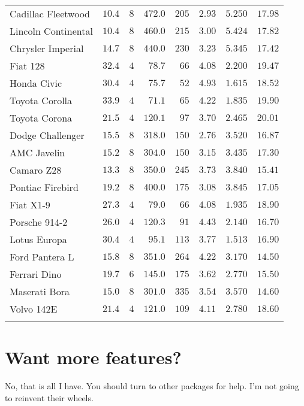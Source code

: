 \documentclass{article}\usepackage[]{graphicx}\usepackage[]{color}
\begin{document}
\begin{longtable}{lrrrrrrr}
Cadillac Fleetwood & \(10.4\) & \(8\) & \(472.0\) & \(205\) & \(2.93\) & \(5.250\) & \(17.98\)\\
\addlinespace
Lincoln Continental & \(10.4\) & \(8\) & \(460.0\) & \(215\) & \(3.00\) & \(5.424\) & \(17.82\)\\
Chrysler Imperial & \(14.7\) & \(8\) & \(440.0\) & \(230\) & \(3.23\) & \(5.345\) & \(17.42\)\\
Fiat 128 & \(32.4\) & \(4\) & \(78.7\) & \(66\) & \(4.08\) & \(2.200\) & \(19.47\)\\
Honda Civic & \(30.4\) & \(4\) & \(75.7\) & \(52\) & \(4.93\) & \(1.615\) & \(18.52\)\\
Toyota Corolla & \(33.9\) & \(4\) & \(71.1\) & \(65\) & \(4.22\) & \(1.835\) & \(19.90\)\\
\addlinespace
Toyota Corona & \(21.5\) & \(4\) & \(120.1\) & \(97\) & \(3.70\) & \(2.465\) & \(20.01\)\\
Dodge Challenger & \(15.5\) & \(8\) & \(318.0\) & \(150\) & \(2.76\) & \(3.520\) & \(16.87\)\\
AMC Javelin & \(15.2\) & \(8\) & \(304.0\) & \(150\) & \(3.15\) & \(3.435\) & \(17.30\)\\
Camaro Z28 & \(13.3\) & \(8\) & \(350.0\) & \(245\) & \(3.73\) & \(3.840\) & \(15.41\)\\
Pontiac Firebird & \(19.2\) & \(8\) & \(400.0\) & \(175\) & \(3.08\) & \(3.845\) & \(17.05\)\\
\addlinespace
Fiat X1-9 & \(27.3\) & \(4\) & \(79.0\) & \(66\) & \(4.08\) & \(1.935\) & \(18.90\)\\
Porsche 914-2 & \(26.0\) & \(4\) & \(120.3\) & \(91\) & \(4.43\) & \(2.140\) & \(16.70\)\\
Lotus Europa & \(30.4\) & \(4\) & \(95.1\) & \(113\) & \(3.77\) & \(1.513\) & \(16.90\)\\
Ford Pantera L & \(15.8\) & \(8\) & \(351.0\) & \(264\) & \(4.22\) & \(3.170\) & \(14.50\)\\
Ferrari Dino & \(19.7\) & \(6\) & \(145.0\) & \(175\) & \(3.62\) & \(2.770\) & \(15.50\)\\
\addlinespace
Maserati Bora & \(15.0\) & \(8\) & \(301.0\) & \(335\) & \(3.54\) & \(3.570\) & \(14.60\)\\
Volvo 142E & \(21.4\) & \(4\) & \(121.0\) & \(109\) & \(4.11\) & \(2.780\) & \(18.60\)\\
\bottomrule{}
\end{longtable}



\section{Want more features?}

No, that is all I have. You should turn to other packages for help. I'm not
going to reinvent their wheels.
\end{document}
